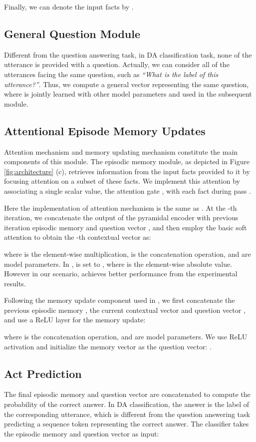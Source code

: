 \documentclass[conference]{IEEEtran}
\begin{document}
	
	Finally, we can denote the input facts by .
	
	\subsection{General Question Module}\label{subsec_question}
	Different from the question answering task, in DA classification task, none of the utterance is provided with a question. Actually, we can consider all of the utterances facing the same question, such as \emph{``What is the label of this utterance?''}. Thus, we compute a general vector  representing the same question, where  is jointly learned with other model parameters and used in the subsequent module.
	
	\subsection{Attentional Episode Memory Updates}\label{subsec_memory}
	Attention mechanism and memory updating mechanism constitute the main components of this module. The episodic memory module, as depicted in Figure \ref{fig:architecture} (c), retrieves information from the input facts  provided to it by focusing attention on a subset of these facts. We implement this attention by associating a single scalar value, the attention gate , with each fact  during pass .
	
	Here the implementation of attention mechanism is the same as \cite{bahdanau2014neural}. At the -th iteration, we concatenate the output  of the pyramidal encoder with previous iteration episodic memory   and question vector , and then employ the basic soft attention to obtain the -th contextual vector as:
	
	where  is the element-wise multiplication,  is the concatenation operation,  and  are model parameters. In \cite{xiong2016dynamic},  is set to , where  is the element-wise absolute value. However in our scenario,  achieves better performance from the experimental results.
	
	Following the memory update component used in \cite{peng2015towards}, we first concatenate the previous episodic memory , the current contextual vector  and question vector , and use a ReLU layer for the memory update:
	
	where  is the concatenation operation,  and  are model parameters. We use ReLU activation and initialize the memory vector as the question vector: . 
	
	\subsection{Act Prediction}\label{subsec_output}
	The final episodic memory  and question vector  are concatenated to compute the probability of the correct answer. In DA classification, the answer is the label of the corresponding utterance, which is different from the question answering task predicting a sequence token representing the correct answer. 
The classifier takes the episodic memory  and question vector  as input:
	
\end{document}
